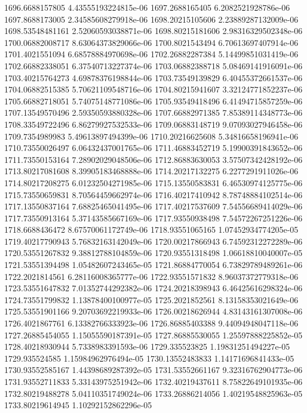 {1696.6688157805 4.43555193224815e-06
1697.2688165405 6.2082521928786e-06
1697.8688173005 2.34585608279918e-06
1698.20215105606 2.23889287132009e-06
1698.53548481161 2.52060593038871e-06
1698.80215181606 2.98316329502348e-06
1700.06882008717 8.63064373829066e-06
1700.8021543494 6.70613697407914e-06
1701.4021551094 6.68578884970698e-06
1702.26882287384 5.14499851031419e-06
1702.66882338051 6.37540713227374e-06
1703.06882388718 5.08469141916091e-06
1703.40215764273 4.69878376198844e-06
1703.73549139829 6.40455372661537e-06
1704.06882515385 5.70621109548716e-06
1704.80215941607 3.32124771852237e-06
1705.66882718051 5.74075148771086e-06
1705.93549418496 6.41494715857259e-06
1707.13549570496 2.59350593880328e-06
1707.66882971385 7.85389114348773e-06
1708.33549722496 6.86279927532533e-06
1709.06883148719 9.07093027946458e-06
1709.7354989983 5.49613897494399e-06
1710.20216625608 5.34816658196941e-06
1710.73550026497 6.06432437001765e-06
1711.46883452719 5.19900391843652e-06
1711.73550153164 7.28902029048506e-06
1712.86883630053 3.57507342428192e-06
1713.80217081608 8.39905183468888e-06
1714.20217132275 6.2277291911026e-06
1714.80217208275 6.01232504271985e-06
1715.13550583831 6.46530974125775e-06
1715.73550659831 8.70564459662974e-06
1716.40217410942 8.78748884102514e-06
1717.13550837164 7.68825465041495e-06
1717.40217537609 7.54556689414029e-06
1717.73550913164 5.37143585667169e-06
1717.93550938498 7.54572267251226e-06
1718.6688436472 8.67570061172749e-06
1718.93551065165 1.07452934774205e-05
1719.40217790943 5.76832163142049e-06
1720.00217866943 6.74592312272289e-06
1720.53551267832 9.38812788104859e-06
1720.93551318498 1.06618810040007e-05
1721.53551394498 1.05482607243465e-05
1721.86884770054 6.73829789489261e-06
1722.2021814561 6.28116008365777e-06
1722.93551571832 8.96037372779318e-06
1723.53551647832 7.01352744292382e-06
1724.20218398943 6.46425616298324e-06
1724.73551799832 1.13878400100977e-05
1725.2021852561 8.13158353021649e-06
1725.53551901166 9.20703692219933e-06
1726.00218626944 4.83143161307008e-06
1726.4021867761 6.13382766333923e-06
1726.86885403388 9.44094948047118e-06
1727.26885454055 1.15055590187391e-05
1727.86885530055 1.25597888225852e-05
1728.40218930944 5.7338983391593e-06
1729.335523825 1.19831251494227e-05
1729.935524585 1.15984962976494e-05
1730.13552483833 1.14171696841433e-05
1730.93552585167 1.44398689287392e-05
1731.53552661167 9.32316762904773e-06
1731.93552711833 5.33143975251942e-06
1732.40219437611 8.75822649101935e-06
1732.80219488278 5.04110351749024e-06
1733.26886214056 1.40219548825963e-05
1733.80219614945 1.10292152862296e-05
}
